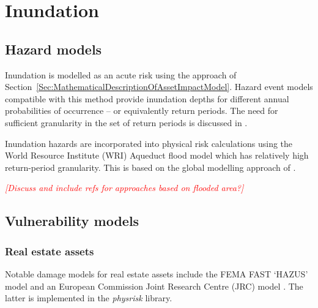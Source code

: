 \documentclass[a4paper,11pt]{extarticle} %
\theoremstyle{definition}
\begin{document}
\section{Inundation}
\subsection{Hazard models}
Inundation is modelled as an acute risk using the approach of Section~\ref{Sec:MathematicalDescriptionOfAssetImpactModel}. Hazard event models compatible with this method provide inundation depths for different annual probabilities of occurrence -- or equivalently return periods. The need for sufficient granularity in the set of return periods is discussed in \cite{WardEtAl:2011}.

Inundation hazards are incorporated into physical risk calculations using the World Resource Institute (WRI) Aqueduct flood model \cite{WardEtAl:2020} which has relatively high return-period granularity. This is based on the global modelling approach of \cite{WardEtAl:2013}.

{\textcolor{red}{\emph{[Discuss and include refs for approaches based on flooded area?]}}}

\subsection{Vulnerability models}

\subsubsection{Real estate assets}
Notable damage models for real estate assets include the FEMA FAST `HAZUS' model \cite{ScawthornEtAl:2006} and an European Commission Joint Research Centre (JRC) model \cite{HuizingaEtAl:2017}. The latter is implemented in the \emph{physrisk} library.
\end{document}
